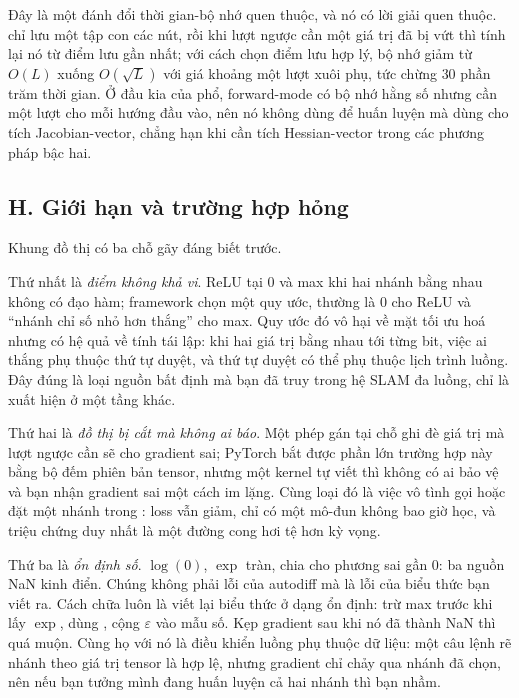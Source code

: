\documentclass[../../../deep_learning.tex]{subfiles}
\begin{document}
Đây là một đánh đổi thời gian-bộ nhớ quen thuộc, và nó có lời giải quen thuộc.  \cite{chen2016training} chỉ lưu một tập con các nút, rồi khi lượt ngược cần một giá trị đã bị vứt thì tính lại nó từ điểm lưu gần nhất; với cách chọn điểm lưu hợp lý, bộ nhớ giảm từ \(O(L)\) xuống \(O(\sqrt{L})\) với giá khoảng một lượt xuôi phụ, tức chừng \(30\) phần trăm thời gian. Ở đầu kia của phổ, forward-mode có bộ nhớ hằng số nhưng cần một lượt cho mỗi hướng đầu vào, nên nó không dùng để huấn luyện mà dùng cho tích Jacobian-vector, chẳng hạn khi cần tích Hessian-vector trong các phương pháp bậc hai.

\subsection{H. Giới hạn và trường hợp hỏng}
Khung đồ thị có ba chỗ gãy đáng biết trước.

Thứ nhất là \emph{điểm không khả vi}. ReLU tại \(0\) và max khi hai nhánh bằng nhau không có đạo hàm; framework chọn một quy ước, thường là \(0\) cho ReLU và ``nhánh chỉ số nhỏ hơn thắng'' cho max. Quy ước đó vô hại về mặt tối ưu hoá nhưng có hệ quả về tính tái lập: khi hai giá trị bằng nhau tới từng bit, việc ai thắng phụ thuộc thứ tự duyệt, và thứ tự duyệt có thể phụ thuộc lịch trình luồng. Đây đúng là loại nguồn bất định mà bạn đã truy trong hệ SLAM đa luồng, chỉ là xuất hiện ở một tầng khác.

Thứ hai là \emph{đồ thị bị cắt mà không ai báo}. Một phép gán tại chỗ ghi đè giá trị mà lượt ngược cần sẽ cho gradient sai; PyTorch bắt được phần lớn trường hợp này bằng bộ đếm phiên bản tensor, nhưng một kernel tự viết thì không có ai bảo vệ và bạn nhận gradient sai một cách im lặng. Cùng loại đó là việc vô tình gọi  hoặc đặt một nhánh trong : loss vẫn giảm, chỉ có một mô-đun không bao giờ học, và triệu chứng duy nhất là một đường cong hơi tệ hơn kỳ vọng.

Thứ ba là \emph{ổn định số}. \(\log(0)\), \(\exp\) tràn, chia cho phương sai gần \(0\): ba nguồn NaN kinh điển. Chúng không phải lỗi của autodiff mà là lỗi của biểu thức bạn viết ra. Cách chữa luôn là viết lại biểu thức ở dạng ổn định: trừ max trước khi lấy \(\exp\), dùng , cộng \(\varepsilon\) vào mẫu số. Kẹp gradient sau khi nó đã thành NaN thì quá muộn. Cùng họ với nó là điều khiển luồng phụ thuộc dữ liệu: một câu lệnh rẽ nhánh theo giá trị tensor là hợp lệ, nhưng gradient chỉ chảy qua nhánh đã chọn, nên nếu bạn tưởng mình đang huấn luyện cả hai nhánh thì bạn nhầm.
\end{document}
